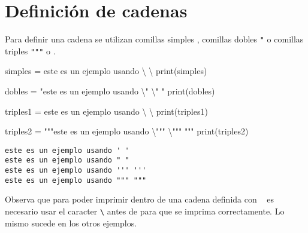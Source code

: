 \documentclass[
  letterpaper,
  DIV=11,
  numbers=noendperiod]{scrreprt}
\newenvironment{Shaded}{\begin{snugshade}}{\end{snugshade}}
\newcommand{\BuiltInTok}[1]{\textcolor[rgb]{0.00,0.23,0.31}{#1}}
\newcommand{\CharTok}[1]{\textcolor[rgb]{0.13,0.47,0.30}{#1}}
\newcommand{\NormalTok}[1]{\textcolor[rgb]{0.00,0.23,0.31}{#1}}
\newcommand{\OperatorTok}[1]{\textcolor[rgb]{0.37,0.37,0.37}{#1}}
\newcommand{\StringTok}[1]{\textcolor[rgb]{0.13,0.47,0.30}{#1}}
\begin{document}
\section{Definición de cadenas}\label{definiciuxf3n-de-cadenas}

Para definir una cadena se utilizan comillas simples
\texttt{\textquotesingle{}}, comillas dobles \texttt{"} o comillas
triples \texttt{"""} o
\texttt{\textquotesingle{}\textquotesingle{}\textquotesingle{}}.

\begin{Shaded}
\begin{Highlighting}[]
\NormalTok{simples }\OperatorTok{=} \StringTok{\textquotesingle{}este es un ejemplo usando }\CharTok{\textbackslash{}\textquotesingle{}}\StringTok{ }\CharTok{\textbackslash{}\textquotesingle{}}\StringTok{ \textquotesingle{}}
\BuiltInTok{print}\NormalTok{(simples)}

\NormalTok{dobles }\OperatorTok{=} \StringTok{"este es un ejemplo usando }\CharTok{\textbackslash{}"}\StringTok{ }\CharTok{\textbackslash{}"}\StringTok{ "}
\BuiltInTok{print}\NormalTok{(dobles)}

\NormalTok{triples1 }\OperatorTok{=} \StringTok{\textquotesingle{}\textquotesingle{}\textquotesingle{}este es un ejemplo usando }\CharTok{\textbackslash{}\textquotesingle{}}\StringTok{\textquotesingle{}\textquotesingle{} }\CharTok{\textbackslash{}\textquotesingle{}}\StringTok{\textquotesingle{}\textquotesingle{} \textquotesingle{}\textquotesingle{}\textquotesingle{}}
\BuiltInTok{print}\NormalTok{(triples1)}

\NormalTok{triples2 }\OperatorTok{=} \StringTok{"""este es un ejemplo usando }\CharTok{\textbackslash{}"}\StringTok{"" }\CharTok{\textbackslash{}"}\StringTok{"" """}
\BuiltInTok{print}\NormalTok{(triples2)}
\end{Highlighting}
\end{Shaded}

\begin{verbatim}
este es un ejemplo usando ' ' 
este es un ejemplo usando " " 
este es un ejemplo usando ''' ''' 
este es un ejemplo usando """ """ 
\end{verbatim}

Observa que para poder imprimir \texttt{\textquotesingle{}} dentro de
una cadena definida con \texttt{\textquotesingle{}\ \textquotesingle{}}
es necesario usar el caracter \texttt{\textbackslash{}} antes de
\texttt{\textquotesingle{}} para que se imprima correctamente. Lo mismo
sucede en los otros ejemplos.
\end{document}
